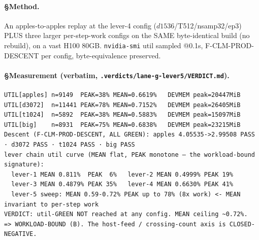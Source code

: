 \documentclass[11pt,a4paper]{article}
\begin{document}
\paragraph{§Method.} An apples-to-apples replay at the lever-4 config
($d1536$/T512/nsamp32/ep3) PLUS three larger per-step-work configs on the SAME
byte-identical build (no rebuild), on a vast H100 80GB. \texttt{nvidia-smi} util
sampled @0.1s, F-CLM-PROD-DESCENT per config, byte-equivalence preserved.

\paragraph{§Measurement (verbatim, \texttt{.verdicts/lane-g-lever5/VERDICT.md}).}
\begin{verbatim}
UTIL[apples] n=9149  PEAK=38% MEAN=0.6619%   DEVMEM peak=20447MiB
UTIL[d3072]  n=11441 PEAK=78% MEAN=0.7152%   DEVMEM peak=26405MiB
UTIL[t1024]  n=5892  PEAK=38% MEAN=0.5883%   DEVMEM peak=15097MiB
UTIL[big]    n=8931  PEAK=75% MEAN=0.6838%   DEVMEM peak=23215MiB
Descent (F-CLM-PROD-DESCENT, ALL GREEN): apples 4.05535->2.99508 PASS · d3072 PASS · t1024 PASS · big PASS
lever chain util curve (MEAN flat, PEAK monotone — the workload-bound signature):
  lever-1 MEAN 0.811%  PEAK  6%   lever-2 MEAN 0.4999% PEAK 19%
  lever-3 MEAN 0.4879% PEAK 35%   lever-4 MEAN 0.6630% PEAK 41%
  lever-5 sweep: MEAN 0.59-0.72% PEAK up to 78% (8x work) <- MEAN invariant to per-step work
VERDICT: util-GREEN NOT reached at any config. MEAN ceiling ~0.72%.
=> WORKLOAD-BOUND (B). The host-feed / crossing-count axis is CLOSED-NEGATIVE.
\end{verbatim}
\end{document}

